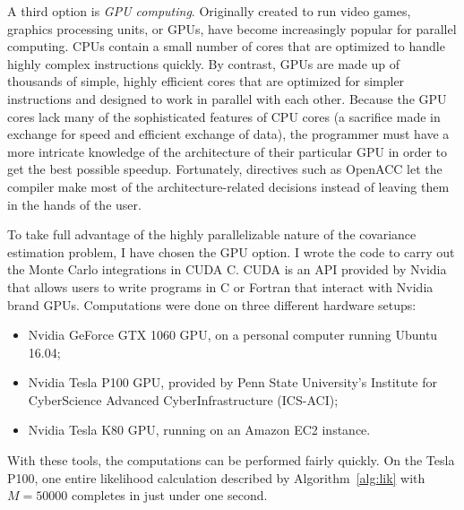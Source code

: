 A third option is \emph{GPU computing}. Originally created to run video games, graphics processing units, or GPUs, have become increasingly popular for parallel computing. CPUs contain a small number of cores that are optimized to handle highly complex instructions quickly. By contrast, GPUs are made up of thousands of simple, highly efficient cores that are optimized for simpler instructions and designed to work in parallel with each other. Because the GPU cores lack many of the sophisticated features of CPU cores (a sacrifice made in exchange for speed and efficient exchange of data), the programmer must have a more intricate knowledge of the architecture of their particular GPU in order to get the best possible speedup. Fortunately, directives such as OpenACC let the compiler make most of the architecture-related decisions instead of leaving them in the hands of the user.

To take full advantage of the highly parallelizable nature of the covariance estimation problem, I have chosen the GPU option. I wrote the code to carry out the Monte Carlo integrations in CUDA C. CUDA is an API provided by Nvidia that allows users to write programs in C or Fortran that interact with Nvidia brand GPUs. Computations were done on three different hardware setups:

\begin{itemize}
	\item Nvidia GeForce GTX 1060 GPU, on a personal computer running Ubuntu 16.04;
	\item Nvidia Tesla P100 GPU, provided by Penn State University's Institute for CyberScience Advanced CyberInfrastructure (ICS-ACI);
	\item Nvidia Tesla K80 GPU, running on an Amazon EC2 instance.
\end{itemize}

With these tools, the computations can be performed fairly quickly. On the Tesla P100, one entire likelihood calculation described by Algorithm~\ref{alg:lik} with $M = 50000$ completes in just under one second.


